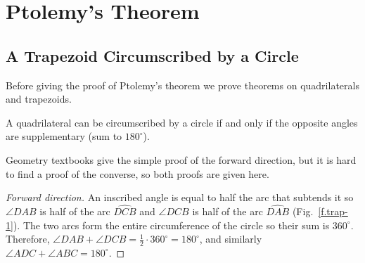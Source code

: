 
\section{Ptolemy's Theorem}\label{a.ptolemy}


\subsection{A Trapezoid Circumscribed by a Circle}\label{s.circumscribed}

Before giving the proof of Ptolemy's theorem we prove theorems on quadrilaterals and trapezoids.

\begin{theorem}\label{thm.quad-circum}
A quadrilateral can be circumscribed by a circle if and only if the opposite angles are supplementary (sum to $180^\circ$).
\end{theorem}

Geometry textbooks give the simple proof of the forward direction, but it is hard to find a proof of the converse, so both proofs are given here.

\begin{proof}[Forward direction]
An inscribed angle is equal to half the arc that subtends it so $\angle DAB$ is half of the arc $\widehat{DCB}$ and $\angle DCB$ is half of the arc $\widehat{DAB}$ (Fig.~\ref{f.trap-1}). The two arcs form the entire circumference of the circle so their sum is $360^\circ$. Therefore, $\angle DAB + \angle DCB = \frac{1}{2} \cdot 360^\circ =  180^\circ$, and similarly $\angle ADC + \angle ABC = 180^\circ$.

\end{proof}

